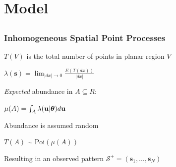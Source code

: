 \documentclass[mathserif,compress]{beamer}\usepackage{graphicx, color}
\def\bs{\mathbf{s}}
\def\bu{\mathbf{u}}
\def\btheta{\mbox{\boldmath $\theta$}}
\def\Poi{\textrm{Poi}}
\newcommand{\cS}{\ensuremath{\mathcal{S}}}
\begin{document}

\section{Model}
\subsection{}
\begin{frame}[fragile]
\frametitle{Inhomogeneous Spatial Point Processes}

	$T(V)$ is the total number of points in planar region $V$
	\begin{center}
		$\lambda(\bs) = \lim_{|dx| \to 0} \frac{E\left( T(dx) \right) }{|dx|}$ \\
	\end{center}
	{\em Expected} abundance in $A \subseteq R$: \\
	\begin{center}
		$\mu(A)=\int_A \lambda(\bu|\btheta)d\bu$ \\
	\end{center}
	Abundance is assumed random \\
	\begin{center}
		$T(A) \sim \Poi(\mu(A))$ \\
	\end{center}
	Resulting in an observed pattern $\cS^+ = (\bs_1,\dots,\bs_N)$

\end{frame}

\end{document}
